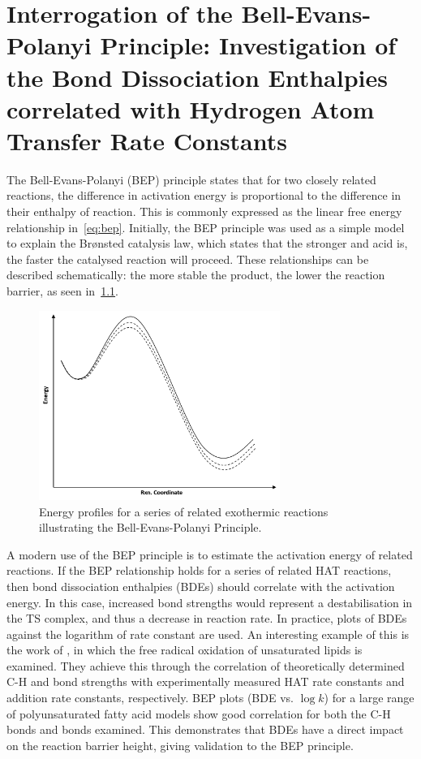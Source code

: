 
\chapter{Interrogation of the Bell-Evans-Polanyi Principle: Investigation of the
Bond Dissociation Enthalpies correlated with Hydrogen Atom Transfer Rate Constants}
\label{ch:bde}



The Bell-Evans-Polanyi (BEP) principle states that for two closely related reactions, the difference in activation energy is proportional to the difference in their enthalpy of reaction.\cite{Bell1936,Evans1938,Dill2003} This is commonly expressed as the linear free energy relationship in~\ref{eq:bep}. Initially, the BEP principle was used as a simple model to explain the Br{\o}nsted catalysis law, which states that the stronger and acid is, the faster the catalysed reaction will proceed.\cite{Bronsted1924} These relationships can be described schematically: the more stable the product, the lower the reaction barrier, as seen in~\ref{fig:bep}.

\begin{figure}[htb]
  \centering
  \includegraphics[width=0.7\textwidth]{figures/bep}
  \caption{Energy profiles for a series of related exothermic reactions illustrating the Bell-Evans-Polanyi Principle.}
\label{fig:bep}
\end{figure}

A modern use of the BEP principle is to estimate the activation energy of related reactions. If the BEP relationship holds for a series of related HAT reactions, then bond dissociation enthalpies (BDEs) should correlate with the activation energy. In this case, increased bond strengths would represent a destabilisation in the TS complex, and thus a decrease in reaction rate. In practice, plots of BDEs against the logarithm of rate constant are used. An interesting example of this is the work of \citet{Pratt2003}, in which the free radical oxidation of unsaturated lipids is examined. They achieve this through the correlation of theoretically determined C-H and  bond strengths with experimentally measured HAT rate constants and  addition rate constants, respectively. BEP plots (BDE vs. $\log k$) for a large range of polyunsaturated fatty acid models show good correlation for both the C-H bonds and  bonds examined. This demonstrates that BDEs have a direct impact on the reaction barrier height, giving validation to the BEP principle.

